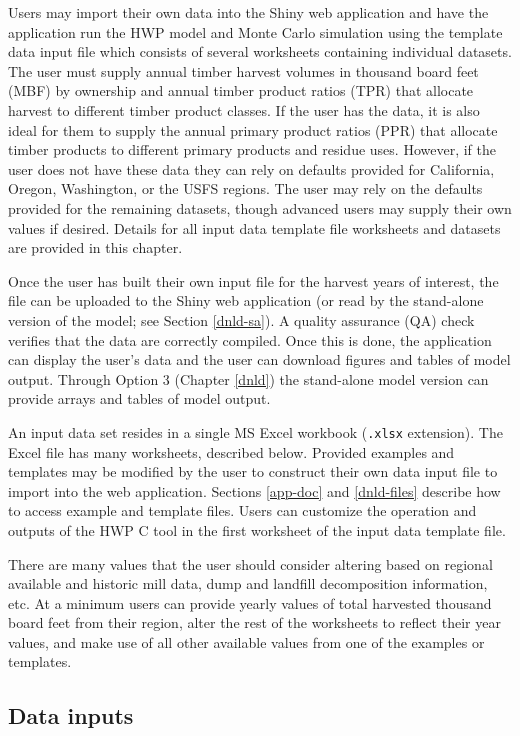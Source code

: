 \documentclass[
  openany]{book}
\begin{document}
Users may import their own data into the Shiny web application and have the application run the HWP model and Monte Carlo simulation using the template data input file which consists of several worksheets containing individual datasets. The user must supply annual timber harvest volumes in thousand board feet (MBF) by ownership and annual timber product ratios (TPR) that allocate harvest to different timber product classes. If the user has the data, it is also ideal for them to supply the annual primary product ratios (PPR) that allocate timber products to different primary products and residue uses. However, if the user does not have these data they can rely on defaults provided for California, Oregon, Washington, or the USFS regions. The user may rely on the defaults provided for the remaining datasets, though advanced users may supply their own values if desired. Details for all input data template file worksheets and datasets are provided in this chapter.

Once the user has built their own input file for the harvest years of interest, the file can be uploaded to the Shiny web application (or read by the stand-alone version of the model; see Section \ref{dnld-sa}). A quality assurance (QA) check verifies that the data are correctly compiled. Once this is done, the application can display the user's data and the user can download figures and tables of model output. Through Option 3 (Chapter \ref{dnld}) the stand-alone model version can provide arrays and tables of model output.

An input data set resides in a single MS Excel workbook (\texttt{.xlsx} extension). The Excel file has many worksheets, described below. Provided examples and templates may be modified by the user to construct their own data input file to import into the web application. Sections \ref{app-doc} and \ref{dnld-files} describe how to access example and template files. Users can customize the operation and outputs of the HWP C tool in the first worksheet of the input data template file.

There are many values that the user should consider altering based on regional available and historic mill data, dump and landfill decomposition information, etc. At a minimum users can provide yearly values of total harvested thousand board feet from their region, alter the rest of the worksheets to reflect their year values, and make use of all other available values from one of the examples or templates.

\hypertarget{own-over-inputSum}{%
\subsection{Data inputs}\label{own-over-inputSum}}
\end{document}
